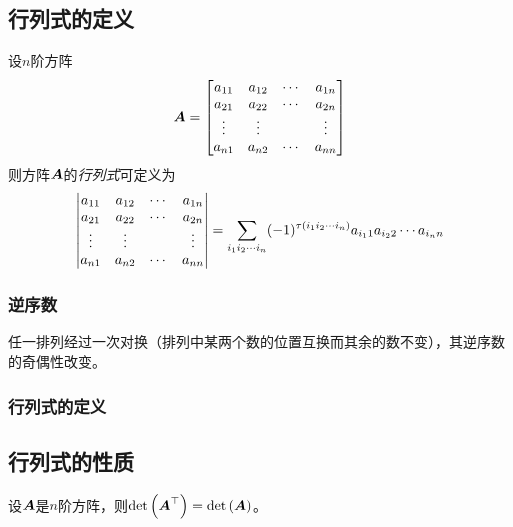 \documentclass{ctexart}
\begin{document}
\subsection{行列式的定义}

\begin{definition}[行列式]
    设\(n\)阶方阵
    \begin{equation*}
        \boldsymbol{A}=\begin{bmatrix}
            a_{11} & a_{12} & \cdots & a_{1n} \\
            a_{21} & a_{22} & \cdots & a_{2n} \\
            \vdots & \vdots &        & \vdots \\
            a_{n1} & a_{n2} & \cdots & a_{nn}
        \end{bmatrix}
    \end{equation*}
    则方阵\(\boldsymbol{A}\)的\emph{行列式}可定义为
    \begin{equation*}
        \begin{vmatrix}
            a_{11} & a_{12} & \cdots & a_{1n} \\
            a_{21} & a_{22} & \cdots & a_{2n} \\
            \vdots & \vdots &        & \vdots \\
            a_{n1} & a_{n2} & \cdots & a_{nn}
        \end{vmatrix}=\sum_{i_1i_2\cdots i_n}(-1)^{\tau\left( i_1i_2\cdots i_n \right)}a_{i_11}a_{i_22}\cdots a_{i_nn}
    \end{equation*}
\end{definition}

\subsubsection*{逆序数}

\begin{theorem}
    任一排列经过一次对换（排列中某两个数的位置互换而其余的数不变），其逆序数的奇偶性改变。
\end{theorem}

\subsubsection*{行列式的定义}

\subsection{行列式的性质}

\begin{property}
    设\(\boldsymbol{A}\)是\(n\)阶方阵，则\(\mathrm{det}\left( \boldsymbol{A}^\top \right)=\mathrm{det}\left( \boldsymbol{A} \right)\)。
\end{property}
\end{document}

